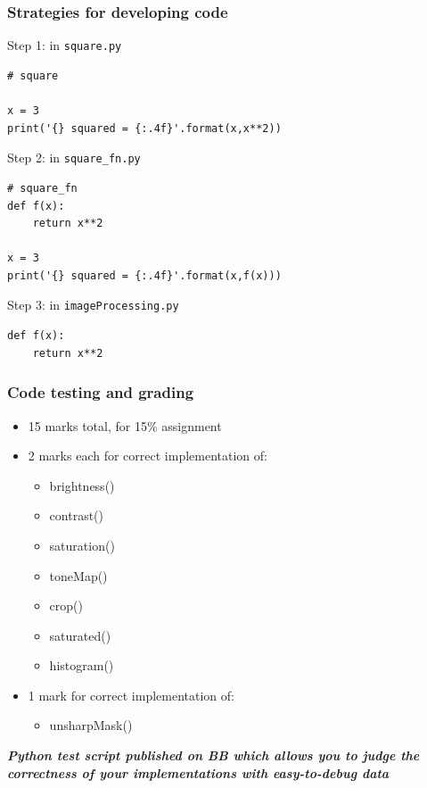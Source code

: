 \documentclass[english,14pt]{beamer}
\begin{document}
\begin{frame}[fragile]

\frametitle{Strategies for developing code}

Step 1: in \texttt{square.py}
\begin{lstlisting}[style=CStyle,basicstyle=\scriptsize]
# square

x = 3
print('{} squared = {:.4f}'.format(x,x**2))
\end{lstlisting}

\pause

Step 2: in \texttt{square\_fn.py}
\begin{lstlisting}[style=CStyle,basicstyle=\scriptsize]
# square_fn
def f(x):
    return x**2

x = 3
print('{} squared = {:.4f}'.format(x,f(x)))
\end{lstlisting}

\pause

Step 3: in \texttt{imageProcessing.py}
\begin{lstlisting}[style=CStyle,basicstyle=\scriptsize]
def f(x):
    return x**2
\end{lstlisting}

\end{frame}

\begin{frame}[fragile]

\frametitle{Code testing and grading}

\vspace*{-3mm}

\begin{itemize}
	\item 15 marks total, for 15\% assignment
	\item 2 marks each for correct implementation of:
	\begin{itemize}
		\item brightness()
		\item contrast()
		\item saturation()
		\item toneMap()
		\item crop()
		\item saturated()
		\item histogram()
	\end{itemize}
	\item 1 mark for correct implementation of:
	\begin{itemize}
		\item unsharpMask()
	\end{itemize}
\end{itemize}

\textbf{\emph{Python test script published on BB which allows you to judge the correctness of your implementations with easy-to-debug data}}

\end{frame}
\end{document}
